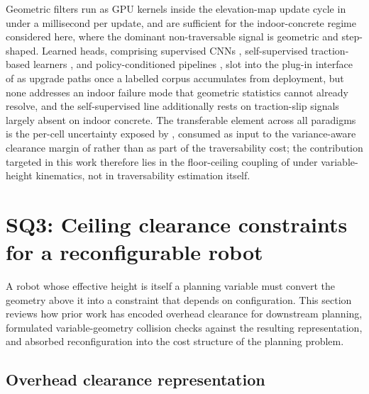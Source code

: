 \documentclass[11pt,a4paper]{article}
\begin{document}
Geometric filters \citep{chilian2009,wermelingerNavigationPlanningLegged2016} run as GPU kernels inside the elevation-map update cycle \citep{mikiElevationMappingLocomotion2022,panGPUAcceleratedRealtime2019} in under a millisecond per update, and are sufficient for the indoor-concrete regime considered here, where the dominant non-traversable signal is geometric and step-shaped. Learned heads, comprising supervised CNNs \citep{chavez-garciaImageClassificationGround2017,erniMEMMultiModalElevation2023,mengTerrainNetVisualModeling2023}, self-supervised traction-based learners \citep{choLearningSelfSupervisedTraversability2024,gasparinoWayFASTERSelfSupervisedTraversability2024,mattamalaWildVisualNavigation2024,seoScaTEScalableFramework2023,caiEVORADeepEvidential2024,karnanSTERLINGSelfSupervisedTerrain2023}, and policy-conditioned pipelines \citep{freyLocomotionPolicyGuided2022}, slot into the plug-in interface of \citet{mikiElevationMappingLocomotion2022} as upgrade paths once a labelled corpus accumulates from deployment, but none addresses an indoor failure mode that geometric statistics cannot already resolve, and the self-supervised line additionally rests on traction-slip signals largely absent on indoor concrete. The transferable element across all paradigms is the per-cell uncertainty exposed by \citet{yangRealtimeNeuralDense2023,seoScaTEScalableFramework2023,caiEVORADeepEvidential2024}, consumed as input to the variance-aware clearance margin of  rather than as part of the traversability cost; the contribution targeted in this work therefore lies in the floor-ceiling coupling of  under variable-height kinematics, not in traversability estimation itself.

\section{SQ3: Ceiling clearance constraints for a reconfigurable robot}
\label{sec:sq3}

A robot whose effective height is itself a planning variable must convert the geometry above it into a constraint that depends on configuration. This section reviews how prior work has encoded overhead clearance for downstream planning, formulated variable-geometry collision checks against the resulting representation, and absorbed reconfiguration into the cost structure of the planning problem.

\subsection{Overhead clearance representation}
\label{sec:sq3:representation}
\end{document}
